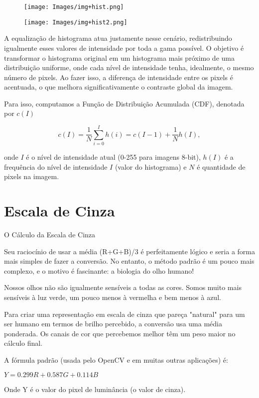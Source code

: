 \documentclass[12pt, a4paper]{article}
\begin{document}
\begin{figure}[H]
    \centering
    \texttt{[image: Images/img+hist.png]}
\end{figure}

\begin{figure}[H]
    \centering
    \texttt{[image: Images/img+hist2.png]}
\end{figure}

A equalização de histograma atua justamente nesse cenário, redistribuindo igualmente esses valores de intensidade por toda a gama possível. O objetivo é transformar o histograma original em um histograma mais próximo de uma distribuição uniforme, onde cada nível de intensidade tenha, idealmente, o mesmo número de pixels. Ao fazer isso, a diferença de intensidade entre os pixels é acentuada, o que melhora significativamente o contraste global da imagem.

Para isso, computamos a Função de Distribuição Acumulada (CDF), denotada por $c(I)$

\[
c(I) = \frac{1}{N}\sum_{i=0}^I h(i) = c(I-1) + \frac{1}{N}h(I),
\]

\noindent onde $I$ é o nível de intensidade atual (0-255 para imagens 8-bit), $h(I)$ é a frequência do nível de intensidade $I$ (valor do histograma) e $N$ é quantidade de pixels na imagem.

\section{Escala de Cinza}
O Cálculo da Escala de Cinza

Seu raciocínio de usar a média (R+G+B)/3 é perfeitamente lógico e seria a forma mais simples de fazer a conversão. No entanto, o método padrão é um pouco mais complexo, e o motivo é fascinante: a biologia do olho humano!

Nossos olhos não são igualmente sensíveis a todas as cores. Somos muito mais sensíveis à luz verde, um pouco menos à vermelha e bem menos à azul.

Para criar uma representação em escala de cinza que pareça "natural" para um ser humano em termos de brilho percebido, a conversão usa uma média ponderada. Os canais de cor que percebemos melhor têm um peso maior no cálculo final.

A fórmula padrão (usada pelo OpenCV e em muitas outras aplicações) é:

$Y=0.299R + 0.587G + 0.114B$

Onde Y é o valor do pixel de luminância (o valor de cinza).
\end{document}
